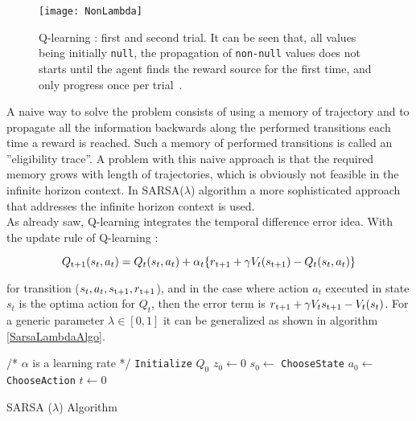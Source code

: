 \begin{figure}[h!]
	\centering
	\texttt{[image: NonLambda]}
	\caption{Q-learning : first and second trial. It can be seen that, all values being initially {\tt null}, the propagation of {\tt non-null} values does not starts until the agent finds the reward source for the first time, and only progress once per trial~\cite{Sigaud:2010:MDP:1841781}.}
	\label{fig:NonLambda}
\end{figure}

A naive way to solve the problem consists of using a memory of trajectory and to propagate all the information backwards along the performed transitions each time a reward is reached. Such a memory of performed transitions is called an ''eligibility trace''. A problem with this naive approach is that the required memory grows with length of trajectories, which is obviously not feasible in the infinite horizon context. In SARSA($\lambda$) algorithm a more sophisticated approach that addresses the infinite horizon context is used. \\

As already saw, Q-learning integrates the temporal difference error idea. With the update rule of Q-learning :

\begin{equation}
	Q\textsubscript{t+1} (s_t, a_t) = Q_t(s_t, a_t) + \alpha_t\{r\textsubscript{t+1} + \gamma V_t(s\textsubscript{t+1}) - Q_t(s_t, a_t)\}
\end{equation}

for transition ($s_t, a_t, s\textsubscript{t+1}, r\textsubscript{t+1}$), and in the case where action $a_t$ executed in state $s_t$ is the optima action for $Q_t$, then the error term is $r\textsubscript{t+1} + \gamma V_t s\textsubscript{t+1} - V_t(s_t)$. For a generic parameter $\lambda \in [0,1]$ it can be generalized as shown in algorithm \ref{SarsaLambdaAlgo}.

\begin{algorithm}
	/* $\alpha$ is a learning rate */ \;
	{\tt Initialize} $Q_0$ \;
	$z_0 \leftarrow 0$ \;
	$s_0 \leftarrow$ {\tt ChooseState} \;
	$a_0 \leftarrow$ {\tt ChooseAction} \;
	$t \leftarrow 0$ \;
\caption{SARSA ($\lambda$) Algorithm \cite{Sigaud:2010:MDP:1841781}}
\label{SarsaLambdaAlgo} 
\end{algorithm}

